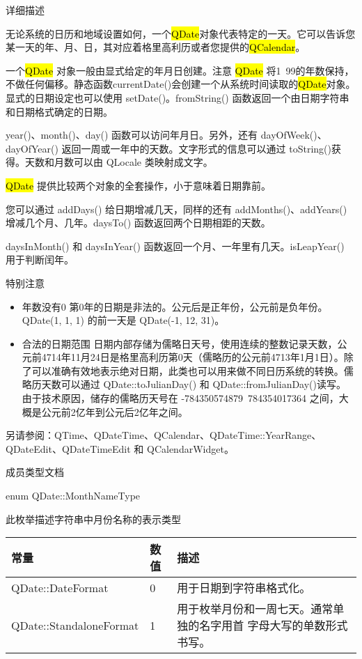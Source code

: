 详细描述

无论系统的日历和地域设置如何，一个\hl{QDate}对象代表特定的一天。它可以告诉您某一天的年、月、日，其对应着格里高利历或者您提供的\hl{QCalendar}。

一个\hl{QDate} 对象一般由显式给定的年月日创建。注意 \hl{QDate} 将1~99的年数保持，不做任何偏移。静态函数currentDate()会创建一个从系统时间读取的\hl{QDate}对象。显式的日期设定也可以使用 setDate()。fromString() 函数返回一个由日期字符串和日期格式确定的日期。

year()、month()、day() 函数可以访问年月日。另外，还有 dayOfWeek()、dayOfYear() 返回一周或一年中的天数。文字形式的信息可以通过 toString()获得。天数和月数可以由 QLocale 类映射成文字。

\hl{QDate} 提供比较两个对象的全套操作，小于意味着日期靠前。

您可以通过 addDays() 给日期增减几天，同样的还有 addMonths()、addYears() 增减几个月、几年。daysTo() 函数返回两个日期相距的天数。

daysInMonth() 和 daysInYear() 函数返回一个月、一年里有几天。isLeapYear() 用于判断闰年。

特别注意

\begin{itemize}
\item 年数没有0 第0年的日期是非法的。公元后是正年份，公元前是负年份。QDate(1, 1, 1) 的前一天是 QDate(-1, 12, 31)。
\item 合法的日期范围 日期内部存储为儒略日天号，使用连续的整数记录天数，公元前4714年11月24日是格里高利历第0天（儒略历的公元前4713年1月1日）。除了可以准确有效地表示绝对日期，此类也可以用来做不同日历系统的转换。儒略历天数可以通过 QDate::toJulianDay() 和 QDate::fromJulianDay()读写。 由于技术原因，储存的儒略历天号在 -784350574879~784354017364 之间，大概是公元前2亿年到公元后2亿年之间。
\end{itemize}

另请参阅：QTime、QDateTime、QCalendar、QDateTime::YearRange、QDateEdit、QDateTimeEdit 和 QCalendarWidget。

\splitLine

成员类型文档

enum QDate::MonthNameType

此枚举描述字符串中月份名称的表示类型

\begin{tabular}{|l|l|l|}
\hline
常量	&数值&	描述\\
\hline
QDate::DateFormat&	0&	用于日期到字符串格式化。\\
\hline
QDate::StandaloneFormat	&1&	用于枚举月份和一周七天。通常单独的名字用首
  字母大写的单数形式书写。\\
\hline
\end{tabular}


